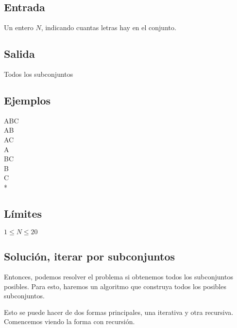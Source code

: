 \subsection*{Entrada}
Un entero \(N\), indicando cuantas letras hay en el conjunto.
\subsection*{Salida}
Todos los subconjuntos

\subsection*{Ejemplos}

\begin{casebox2}

	\hline
\end{casebox2}

\begin{casebox2}
	{
		ABC \\
		AB \\
		AC\\
		A\\
		BC\\
		B\\
		C\\
		* \\
	}
\hline
\end{casebox2}

\subsection*{Límites}
\begin{plimits}
	\item \(1\leq N \leq 20 \)
\end{plimits}

\subsection*{Solución, iterar por subconjuntos}
Entonces, podemos resolver el problema si obtenemos todos los subconjuntos posibles. Para esto, haremos un algoritmo que construya todos los posibles subconjuntos.

Esto se puede hacer de dos formas principales, una iterativa y otra recursiva. Comencemos viendo la forma con recursión.

